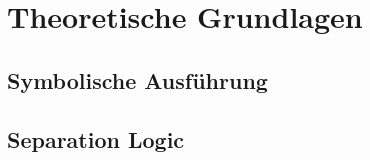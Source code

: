 \section{Theoretische Grundlagen}

\subsection{Symbolische Ausführung}

\subsection{Separation Logic}